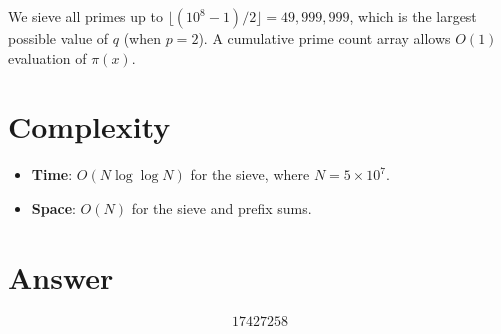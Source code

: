 \documentclass[12pt]{article}
\begin{document}
We sieve all primes up to $\lfloor(10^8-1)/2\rfloor = 49{,}999{,}999$, which is the largest possible value of $q$ (when $p = 2$). A cumulative prime count array allows $O(1)$ evaluation of $\pi(x)$.

\section{Complexity}

\begin{itemize}
    \item \textbf{Time}: $O(N \log \log N)$ for the sieve, where $N = 5 \times 10^7$.
    \item \textbf{Space}: $O(N)$ for the sieve and prefix sums.
\end{itemize}

\section{Answer}

\[
\boxed{17427258}
\]
\end{document}
